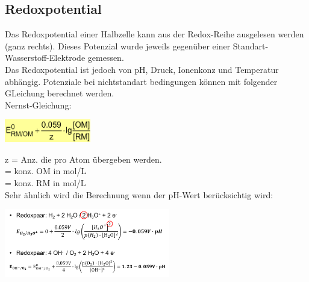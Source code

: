 \subsection{Redoxpotential}
Das Redoxpotential einer Halbzelle kann aus der Redox-Reihe ausgelesen werden (ganz rechts). Dieses Potenzial wurde jeweils gegenüber einer Standart-Wasserstoff-Elektrode gemessen.\\ Das Redoxpotential ist jedoch von pH, Druck, Ionenkonz und Temperatur abhängig. Potenziale bei nichtstandart bedingungen können mit folgender GLeichung berechnet werden.\\
Nernst-Gleichung:\\
\begin{center}
    \includegraphics[height=1cm]{pictures/Nernst.png}
\end{center}
z = Anz.  die pro Atom übergeben werden.\\\ce{[OM]} = konz. OM in mol/L\\\ce{[RM]} = konz. RM in mol/L\\
Sehr ähnlich wird die Berechnung wenn der pH-Wert berücksichtig wird:
\begin{center}
    \includegraphics[height=3cm]{pictures/Nernstph.png}
\end{center}